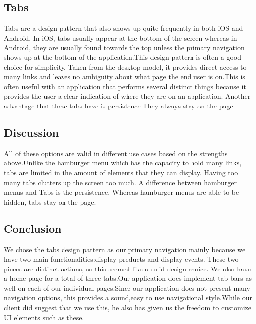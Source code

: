 \documentclass[onecolumn, draftclsnofoot,10pt, compsoc]{IEEEtran}
\begin{document}
    \subsection{Tabs}
        Tabs are a design pattern that also shows up quite frequently in both iOS and Android. In iOS, tabs usually appear at the bottom of the screen whereas in Android, they are usually found towards the top unless the primary navigation shows up at the bottom of the application.This design pattern is often a good choice for simplicity. Taken from the desktop model, it provides direct access to many links and leaves no ambiguity about what page the end user is on.This is often useful with an application that performs several distinct things because it provides the user a clear indication of where they are on an application. Another advantage that these tabs have is persistence.They always stay on the page. 
     \subsection{Discussion}  
     All of these options are valid in different use cases based on the strengths above.Unlike the hamburger menu which has the capacity to hold many links, tabs are limited in the amount of elements that they can display. Having too many tabs clutters up the screen too much. A difference between hamburger menus and Tabs is the persistence. Whereas hamburger menus are able to be hidden, tabs stay on the page.
     
     \subsection{Conclusion}  
     We chose the tabs design pattern as our primary navigation mainly because we have two main functionalities:display products and display events. These two pieces are distinct actions, so this seemed like a solid design choice. We also have a home page for a total of three tabs.Our application does implement tab bars as well on each of our individual pages.Since our application does not present many navigation options, this provides a sound,easy to use navigational style.While our client did suggest that we use this, he also has given us the freedom to customize UI elements such as these.
       


\end{document}
